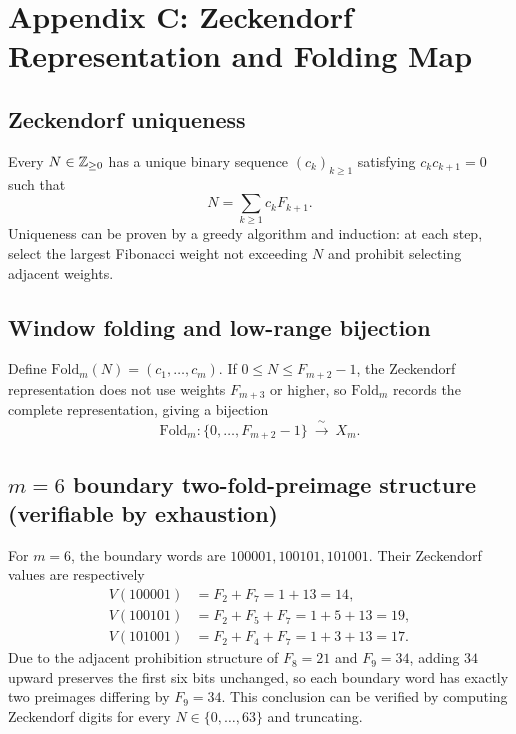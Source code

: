 \section{Appendix C: Zeckendorf Representation and Folding Map}

\subsection{Zeckendorf uniqueness}

Every $N\in\mathbb{Z}_{\ge 0}$ has a unique binary sequence $(c_k)_{k\ge 1}$ satisfying $c_kc_{k+1}=0$ such that
\[
N=\sum_{k\ge 1}c_kF_{k+1}.
\]
Uniqueness can be proven by a greedy algorithm and induction: at each step, select the largest Fibonacci weight not exceeding $N$ and prohibit selecting adjacent weights.

\subsection{Window folding and low-range bijection}

Define $\mathrm{Fold}_m(N)=(c_1,\dots,c_m)$. If $0\le N\le F_{m+2}-1$, the Zeckendorf representation does not use weights $F_{m+3}$ or higher, so $\mathrm{Fold}_m$ records the complete representation, giving a bijection
\[
\mathrm{Fold}_m:\{0,\dots,F_{m+2}-1\}\ \xrightarrow{\ \sim\ }\ X_m.
\]

\subsection{\texorpdfstring{$m=6$}{m=6} boundary two-fold-preimage structure (verifiable by exhaustion)}

For $m=6$, the boundary words are $100001,100101,101001$. Their Zeckendorf values are respectively
\begin{align*}
V(100001)&=F_2+F_7=1+13=14,\\
V(100101)&=F_2+F_5+F_7=1+5+13=19,\\
V(101001)&=F_2+F_4+F_7=1+3+13=17.
\end{align*}
Due to the adjacent prohibition structure of $F_8=21$ and $F_9=34$, adding $34$ upward preserves the first six bits unchanged, so each boundary word has exactly two preimages differing by $F_9=34$. This conclusion can be verified by computing Zeckendorf digits for every $N\in\{0,\dots,63\}$ and truncating.

